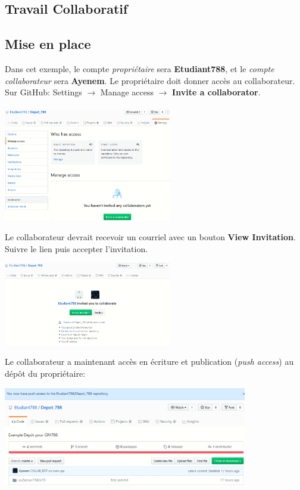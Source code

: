 \documentclass{article}
\begin{document}
\begin{center}\section{Travail Collaboratif}\end{center}

\subsection{Mise en place}
Dans cet exemple, le compte \textit{propriétaire} sera \textbf{Etudiant788}, et le \textit{compte collaborateur} sera \textbf{Ayenem}.
Le propriétaire doit donner accès au collaborateur. Sur GitHub: Settings $\rightarrow$ Manage access $\rightarrow$ \textbf{Invite a collaborator}.\\\\
\includegraphics[width=0.55\textwidth, center]{Invite_Collaborator}

\begin{flushleft}
Le collaborateur devrait recevoir un courriel avec un bouton \textbf{View Invitation}. Suivre le lien puis accepter l'invitation.\\
\end{flushleft}
\includegraphics[width=0.55\textwidth, center]{Collab_Invite}

\begin{flushleft}
Le collaborateur a maintenant accès en écriture et publication (\textit{push access}) au dépôt du propriétaire:\\
\end{flushleft}
\includegraphics[width=0.8\textwidth, center]{Collab_Access}
\end{document}
